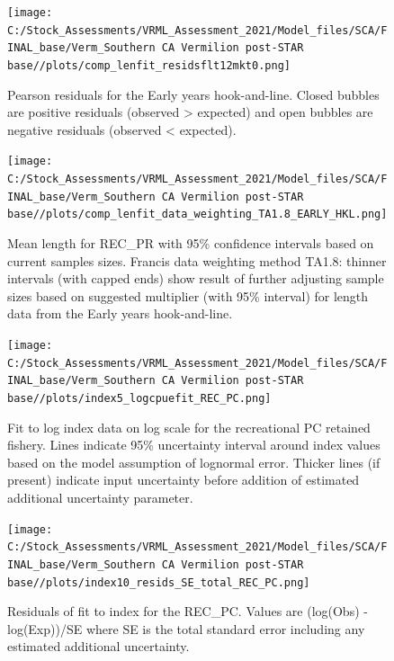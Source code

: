\documentclass[
  english,
  a4paper,
]{article}
\begin{document}
\begin{figure}
\centering
\texttt{[image: C:/Stock\_Assessments/VRML\_Assessment\_2021/Model\_files/SCA/FINAL\_base/Verm\_Southern CA Vermilion post-STAR base//plots/comp\_lenfit\_residsflt12mkt0.png]}
\caption{Pearson residuals for the Early years hook-and-line. Closed bubbles are positive residuals (observed \textgreater{} expected) and open bubbles are negative residuals (observed \textless{} expected).\label{fig:len-pearson-EARLY-HKL}}
\end{figure}

\begin{figure}
\centering
\texttt{[image: C:/Stock\_Assessments/VRML\_Assessment\_2021/Model\_files/SCA/FINAL\_base/Verm\_Southern CA Vermilion post-STAR base//plots/comp\_lenfit\_data\_weighting\_TA1.8\_EARLY\_HKL.png]}
\caption{Mean length for REC\_PR with 95\% confidence intervals based on current samples sizes. Francis data weighting method TA1.8: thinner intervals (with capped ends) show result of further adjusting sample sizes based on suggested multiplier (with 95\% interval) for length data from the Early years hook-and-line.\label{fig:mean-len-fit-EARLY-HKL}}
\end{figure}

\FloatBarrier

\FloatBarrier

\begin{figure}
\centering
\texttt{[image: C:/Stock\_Assessments/VRML\_Assessment\_2021/Model\_files/SCA/FINAL\_base/Verm\_Southern CA Vermilion post-STAR base//plots/index5\_logcpuefit\_REC\_PC.png]}
\caption{Fit to log index data on log scale for the recreational PC retained fishery. Lines indicate 95\% uncertainty interval around index values based on the model assumption of lognormal error. Thicker lines (if present) indicate input uncertainty before addition of estimated additional uncertainty parameter.\label{fig:log-cpue-REC-PC}}
\end{figure}

\begin{figure}
\centering
\texttt{[image: C:/Stock\_Assessments/VRML\_Assessment\_2021/Model\_files/SCA/FINAL\_base/Verm\_Southern CA Vermilion post-STAR base//plots/index10\_resids\_SE\_total\_REC\_PC.png]}
\caption{Residuals of fit to index for the REC\_PC. Values are (log(Obs) - log(Exp))/SE where SE is the total standard error including any estimated additional uncertainty.\label{fig:cpue-resid-REC-PC}}
\end{figure}
\end{document}
